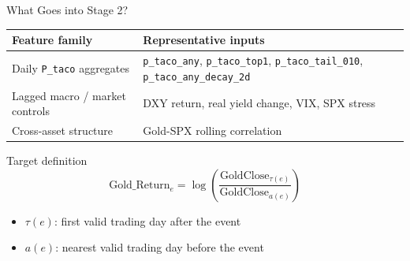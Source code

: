 \begin{frame}{What Goes into Stage 2?}
  \footnotesize
  \begin{table}
    \centering
    \renewcommand{\arraystretch}{1.18}
    \begin{tabular}{>{\raggedright\arraybackslash}p{} >{\raggedright\arraybackslash}p{}}
      \toprule
      Feature family & Representative inputs \\
      \midrule
      Daily \texttt{P\_taco} aggregates & \texttt{p\_taco\_any}, \texttt{p\_taco\_top1}, \texttt{p\_taco\_tail\_010}, \texttt{p\_taco\_any\_decay\_2d} \\
      Lagged macro / market controls & DXY return, real yield change, VIX, SPX stress \\
      Cross-asset structure & Gold-SPX rolling correlation \\
      \bottomrule
    \end{tabular}
  \end{table}

  \vspace{0.6em}
  \begin{block}{Target definition}
    \[
    \mathrm{Gold\_Return}_e=
    \log\left(
    \frac{\mathrm{GoldClose}_{\tau(e)}}{\mathrm{GoldClose}_{a(e)}}
    \right)
    \]

    \vspace{0.2em}
    \footnotesize
    \begin{itemize}
      \item $\tau(e)$: first valid trading day after the event
      \item $a(e)$: nearest valid trading day before the event
    \end{itemize}
  \end{block}
\end{frame}
